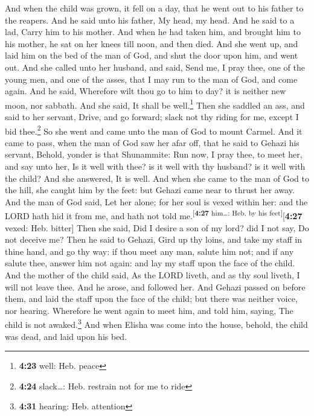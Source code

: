  And when the child was grown, it fell on a day, that he
went out to his father to the reapers.  And he said unto
his father, My head, my head. And he said to a lad, Carry him to his
mother.  And when he had taken him, and brought him to
his mother, he sat on her knees till noon, and then died.
 And she went up, and laid him on the bed of the man of
God, and shut the door upon him, and went out.  And she
called unto her husband, and said, Send me, I pray thee, one of the
young men, and one of the asses, that I may run to the man of God, and
come again.  And he said, Wherefore wilt thou go to him
to day? it is neither new moon, nor sabbath. And she said, It shall be
well.\footnote{\textbf{4:23} well: Heb. peace}  Then she
saddled an ass, and said to her servant, Drive, and go forward; slack
not thy riding for me, except I bid thee.\footnote{\textbf{4:24}
  slack\ldots: Heb. restrain not for me to ride}  So she
went and came unto the man of God to mount Carmel. And it came to pass,
when the man of God saw her afar off, that he said to Gehazi his
servant, Behold, yonder is that Shunammite:  Run now, I
pray thee, to meet her, and say unto her, Is it well with thee? is it
well with thy husband? is it well with the child? And she answered, It
is well.  And when she came to the man of God to the
hill, she caught him by the feet: but Gehazi came near to thrust her
away. And the man of God said, Let her alone; for her soul is vexed
within her: and the LORD hath hid it from me, and hath not told
me.\textsuperscript{{[}\textbf{4:27} him\ldots: Heb. by his
feet{]}}{[}\textbf{4:27} vexed: Heb. bitter{]}  Then she
said, Did I desire a son of my lord? did I not say, Do not deceive me?
 Then he said to Gehazi, Gird up thy loins, and take my
staff in thine hand, and go thy way: if thou meet any man, salute him
not; and if any salute thee, answer him not again: and lay my staff upon
the face of the child.  And the mother of the child said,
As the LORD liveth, and as thy soul liveth, I will not leave thee. And
he arose, and followed her.  And Gehazi passed on before
them, and laid the staff upon the face of the child; but there was
neither voice, nor hearing. Wherefore he went again to meet him, and
told him, saying, The child is not awaked.\footnote{\textbf{4:31}
  hearing: Heb. attention}  And when Elisha was come into
the house, behold, the child was dead, and laid upon his bed.
